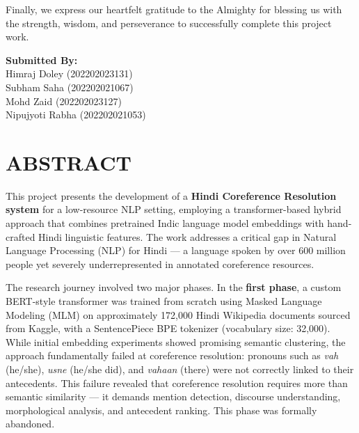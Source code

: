 \documentclass[12pt,a4paper]{report}
\begin{document}
\noindent Finally, we express our heartfelt gratitude to the Almighty for blessing us with the strength, wisdom, and perseverance to successfully complete this project work.

\vspace{1cm}
\begin{flushright}
\textbf{Submitted By:}\\
Himraj Doley    (202202023131)\\
Subham Saha     (202202021067)\\
Mohd Zaid       (202202023127)\\
Nipujyoti Rabha (202202021053)
\end{flushright}


\newpage
\chapter*{\fontsize{16}{19}\selectfont ABSTRACT}

\noindent This project presents the development of a \textbf{Hindi Coreference Resolution system} for a low-resource NLP setting, employing a transformer-based hybrid approach that combines pretrained Indic language model embeddings with hand-crafted Hindi linguistic features. The work addresses a critical gap in Natural Language Processing (NLP) for Hindi --- a language spoken by over 600 million people yet severely underrepresented in annotated coreference resources.

\noindent The research journey involved two major phases. In the \textbf{first phase}, a custom BERT-style transformer was trained from scratch using Masked Language Modeling (MLM) on approximately 172,000 Hindi Wikipedia documents sourced from Kaggle, with a SentencePiece BPE tokenizer (vocabulary size: 32,000). While initial embedding experiments showed promising semantic clustering, the approach fundamentally failed at coreference resolution: pronouns such as \textit{vah} (he/she), \textit{usne} (he/she did), and \textit{vahaan} (there) were not correctly linked to their antecedents. This failure revealed that coreference resolution requires more than semantic similarity --- it demands mention detection, discourse understanding, morphological analysis, and antecedent ranking. This phase was formally abandoned.
\end{document}
